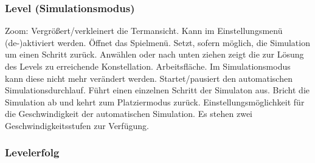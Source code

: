 \subsubsection{Level (Simulationsmodus)}

\begin{center}
\setlength\fboxsep{20pt}
\setlength\fboxrule{1pt}
\end{center}

\begin{requirements}
 Zoom: Vergrößert/verkleinert die Termansicht. Kann im Einstellungsmenü (de-)aktiviert werden.
 Öffnet das Spielmenü.
 Setzt, sofern möglich, die Simulation um einen Schritt zurück.
 Anwählen oder nach unten ziehen zeigt die zur Lösung des Levels zu erreichende Konstellation.
 Arbeitsfläche. Im Simulationsmodus kann diese nicht mehr verändert werden.
 Startet/pausiert den automatischen Simulationsdurchlauf.
 Führt einen einzelnen Schritt der Simulaton aus.
 Bricht die Simulation ab und kehrt zum Platziermodus zurück.
 Einstellungsmöglichkeit für die Geschwindigkeit der automatischen Simulation. Es stehen zwei Geschwindigkeitsstufen zur Verfügung.
\end{requirements}

\subsubsection{Levelerfolg}

